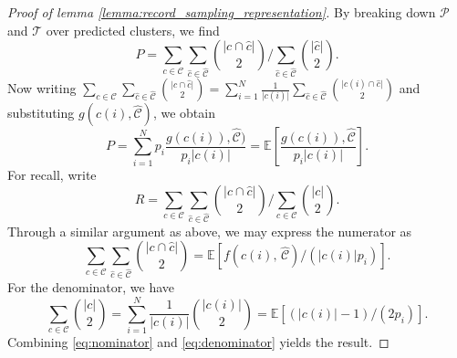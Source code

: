 \documentclass[fontsize=11pt]{article}
\theoremstyle{definition}
\begin{document}
\begin{proof}[Proof of lemma \ref{lemma:record_sampling_representation}]
By breaking down $\mathcal{P}$ and $\mathcal{T}$ over predicted clusters, we find
\begin{equation}
    P = \sum_{c\in\mathcal{C}} \sum_{\hat c \in \widehat{\mathcal{C}}} {\lvert c \cap \hat c \rvert \choose 2} \Big/ \sum_{\hat c \in \widehat{\mathcal{C}}} {\lvert \hat c \rvert \choose 2}.
\end{equation}
Now writing $\sum_{c \in \mathcal{C}} \sum_{\hat c \in \widehat{\mathcal{C}}}{\lvert c \cap \hat c \rvert \choose 2} = \sum_{i=1}^{N} \frac{1}{\lvert c(i) \rvert} \sum_{\hat c \in \widehat{\mathcal{C}}} {\lvert c(i) \cap \hat c \rvert \choose 2}$ and substituting $g(c(i), \widehat{\mathcal{C}})$, we obtain
\begin{equation}
    P = \sum_{i=1}^N p_i \frac{g(c(i)), \widehat{\mathcal{C}})}{p_i \lvert c(i) \rvert} = \mathbb{E}\left[ \frac{g(c(i)), \widehat{\mathcal{C}}}{p_i \lvert c(i) \rvert} \right].
\end{equation}
For recall, write 
\begin{equation}\label{eq:recall_cluster_form}
    R = \sum_{c\in\mathcal{C}} \sum_{\hat c \in \widehat{\mathcal{C}}} {\lvert c \cap \hat c \rvert \choose 2} \Big/ \sum_{ c \in {\mathcal{C}}} {\lvert c \rvert \choose 2}.
\end{equation}
Through a similar argument as above, we may express the numerator as 
\begin{equation}\label{eq:nominator}
    \sum_{c\in\mathcal{C}} \sum_{\hat c \in \widehat{\mathcal{C}}} {\lvert c \cap \hat c \rvert \choose 2} = \mathbb{E}\left[ f(c(i),\, \widehat{\mathcal{C}})  \big/ (\lvert c(i) \rvert p_i) \right].
\end{equation}
For the denominator, we have
\begin{equation}\label{eq:denominator}
    \sum_{c \in \mathcal{C}} {\lvert c \rvert \choose 2} = \sum_{i=1}^N \frac{1}{\lvert c(i) \rvert}  {\lvert c(i) \rvert \choose 2} = \mathbb{E}[ (\lvert c(i) \rvert - 1)/(2 p_i)].
\end{equation}
Combining \eqref{eq:nominator} and \eqref{eq:denominator} yields the result. 
\end{proof}
\end{document}
